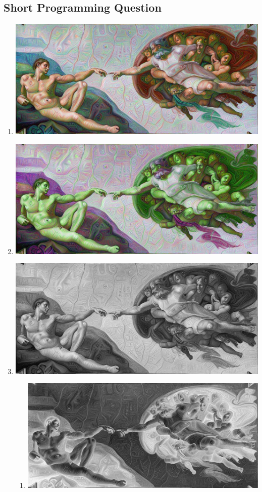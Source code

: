 \documentclass[man]{apa6}
\begin{document}
\subsection{Short Programming Question}
	\begin{enumerate}
		\item \includegraphics[width=\textwidth]{plots/2/inputPS0Q2.jpg}
		\item \includegraphics[width=\textwidth]{plots/2/swapImgPS0Q2.png}
		\item \includegraphics[width=\textwidth]{plots/2/grayImgPS0Q2.png}
			\begin{enumerate}	
				\item \includegraphics[width=\textwidth]{plots/2/negativeImgPS0Q2.png}

\end{enumerate}
\end{enumerate}
\end{document}
